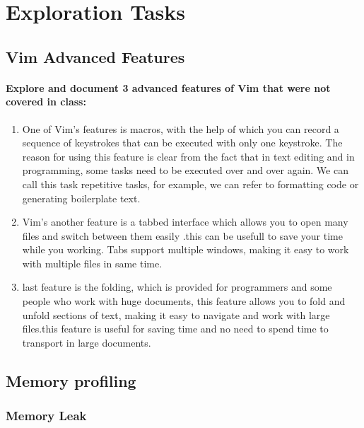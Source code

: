 \documentclass[11pt]{article}
\begin{document}

\section{Exploration Tasks}
\subsection{Vim Advanced Features}
\paragraph{Explore and document 3 advanced features of Vim that were not covered in class:}

\begin{enumerate}
    \item One of Vim’s features is macros, with the help of which you can record a sequence
 of keystrokes that can be executed with only one keystroke. The reason for using
 this feature is clear from the fact that in text editing and in programming, some
 tasks need to be executed over and over again. We can call this task repetitive
 tasks, for example, we can refer to formatting code or generating boilerplate text.
    \item Vim’s another feature is a tabbed interface which allows you to open many files and
 switch between them easily .this can be usefull to save your time while you working.
 Tabs support multiple windows, making it easy to work with multiple files in same
 time.
    \item last feature is the folding, which is provided for programmers and some people who
 work with huge documents, this feature allows you to fold and unfold sections of
 text, making it easy to navigate and work with large files.this feature is useful for
 saving time and no need to spend time to transport in large documents.
\end{enumerate}

\subsection{Memory profiling}
\subsubsection{Memory Leak}
\end{document}

